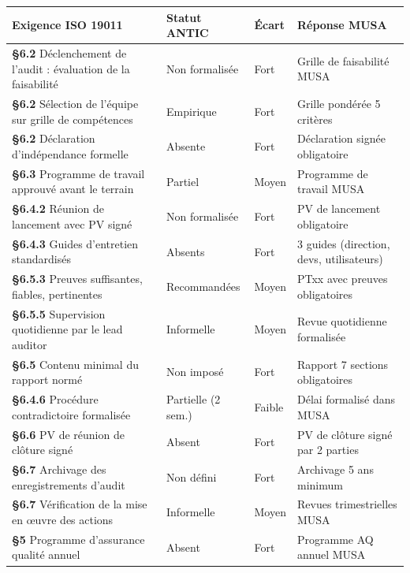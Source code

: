 \documentclass[12pt,a4paper,oneside]{report}
\begin{document}
\begin{longtable}{|p{4cm}|p{3.5cm}|p{2cm}|p{3.5cm}|}
\hline
\rowcolor{theadcolor}
\color{white}\textbf{Exigence ISO 19011} &
\color{white}\textbf{Statut ANTIC} &
\color{white}\textbf{Écart} &
\color{white}\textbf{Réponse MUSA} \\
\hline\endhead\hline\endfoot
\rowcolor{trow1}
\textbf{§6.2} Déclenchement de l'audit : évaluation de la faisabilité &
  Non formalisée & Fort & Grille de faisabilité MUSA \\
\hline\rowcolor{trow2}
\textbf{§6.2} Sélection de l'équipe sur grille de compétences &
  Empirique & Fort & Grille pondérée 5 critères \\
\hline\rowcolor{trow1}
\textbf{§6.2} Déclaration d'indépendance formelle &
  Absente & Fort & Déclaration signée obligatoire \\
\hline\rowcolor{trow2}
\textbf{§6.3} Programme de travail approuvé avant le terrain &
  Partiel & Moyen & Programme de travail MUSA \\
\hline\rowcolor{trow1}
\textbf{§6.4.2} Réunion de lancement avec PV signé &
  Non formalisée & Fort & PV de lancement obligatoire \\
\hline\rowcolor{trow2}
\textbf{§6.4.3} Guides d'entretien standardisés &
  Absents & Fort & 3 guides (direction, devs, utilisateurs) \\
\hline\rowcolor{trow1}
\textbf{§6.5.3} Preuves suffisantes, fiables, pertinentes &
  Recommandées & Moyen & PTxx avec preuves obligatoires \\
\hline\rowcolor{trow2}
\textbf{§6.5.5} Supervision quotidienne par le lead auditor &
  Informelle & Moyen & Revue quotidienne formalisée \\
\hline\rowcolor{trow1}
\textbf{§6.5} Contenu minimal du rapport normé &
  Non imposé & Fort & Rapport 7 sections obligatoires \\
\hline\rowcolor{trow2}
\textbf{§6.4.6} Procédure contradictoire formalisée &
  Partielle (2 sem.) & Faible & Délai formalisé dans MUSA \\
\hline\rowcolor{trow1}
\textbf{§6.6} PV de réunion de clôture signé &
  Absent & Fort & PV de clôture signé par 2 parties \\
\hline\rowcolor{trow2}
\textbf{§6.7} Archivage des enregistrements d'audit &
  Non défini & Fort & Archivage 5 ans minimum \\
\hline\rowcolor{trow1}
\textbf{§6.7} Vérification de la mise en œuvre des actions &
  Informelle & Moyen & Revues trimestrielles MUSA \\
\hline\rowcolor{trow2}
\textbf{§5} Programme d'assurance qualité annuel &
  Absent & Fort & Programme AQ annuel MUSA \\
\hline
\end{longtable}
\end{document}
